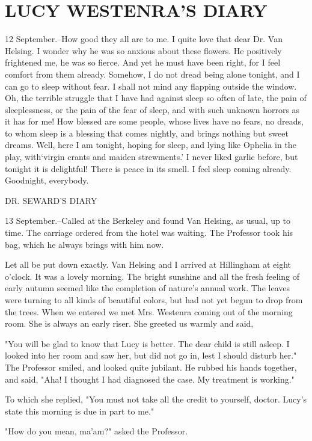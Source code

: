 \chapter{LUCY WESTENRA'S DIARY}

12 September.--How good they all are to me. I quite love that dear Dr. Van Helsing. I wonder why he was so anxious about these flowers. He positively frightened me, he was so fierce. And yet he must have been right, for I feel comfort from them already. Somehow, I do not dread being alone tonight, and I can go to sleep without fear. I shall not mind any flapping outside the window. Oh, the terrible struggle that I have had against sleep so often of late, the pain of sleeplessness, or the pain of the fear of sleep, and with such unknown horrors as it has for me! How blessed are some people, whose lives have no fears, no dreads, to whom sleep is a blessing that comes nightly, and brings nothing but sweet dreams. Well, here I am tonight, hoping for sleep, and lying like Ophelia in the play, with`virgin crants and maiden strewments.' I never liked garlic before, but tonight it is delightful! There is peace in its smell. I feel sleep coming already. Goodnight, everybody. 

DR. SEWARD'S DIARY 

13 September.--Called at the Berkeley and found Van Helsing, as usual, up to time. The carriage ordered from the hotel was waiting. The Professor took his bag, which he always brings with him now. 

Let all be put down exactly. Van Helsing and I arrived at Hillingham at eight o'clock. It was a lovely morning. The bright sunshine and all the fresh feeling of early autumn seemed like the completion of nature's annual work. The leaves were turning to all kinds of beautiful colors, but had not yet begun to drop from the trees. When we entered we met Mrs. Westenra coming out of the morning room. She is always an early riser. She greeted us warmly and said, 

"You will be glad to know that Lucy is better. The dear child is still asleep. I looked into her room and saw her, but did not go in, lest I should disturb her." The Professor smiled, and looked quite jubilant. He rubbed his hands together, and said, "Aha! I thought I had diagnosed the case. My treatment is working." 

To which she replied, "You must not take all the credit to yourself, doctor. Lucy's state this morning is due in part to me." 

"How do you mean, ma'am?" asked the Professor. 

